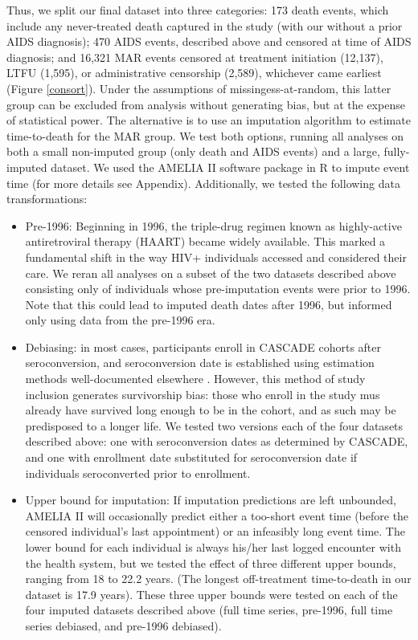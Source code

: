 \documentclass[12pt, titlepage, proquest]{article}
\begin{document}
Thus, we split our final dataset into three categories: 173 death events, which include any never-treated death captured in the study (with our without a prior AIDS diagnosis); 470 AIDS events, described above and censored at time of AIDS diagnosis; and 16,321 MAR events censored at treatment initiation (12,137), LTFU (1,595), or administrative censorship (2,589), whichever came earliest (Figure \ref{consort}). Under the assumptions of missingess-at-random, this latter group can be excluded from analysis without generating bias, but at the expense of statistical power. The alternative is to use an imputation algorithm to estimate time-to-death for the MAR group. We test both options, running all analyses on both a small non-imputed group (only death and AIDS events) and a large, fully-imputed dataset. We used the AMELIA II software package in R \cite{honaker_amelia_2015} to impute event time (for more details see Appendix). Additionally, we tested the following data  transformations:

\begin{itemize}
	\item Pre-1996: Beginning in 1996, the triple-drug regimen known as highly-active antiretroviral therapy (HAART) became widely available. This marked a fundamental shift in the way HIV+ individuals accessed and considered their care. We reran all analyses on a subset of the two datasets described above consisting only of individuals whose pre-imputation events were prior to 1996. Note that this could lead to imputed death dates after 1996, but informed only using data from the pre-1996 era.

	\item Debiasing: in most cases, participants enroll in CASCADE cohorts after seroconversion, and seroconversion date is established using estimation methods well-documented elsewhere \cite{_time_2000}. However, this method of study inclusion generates survivorship bias: those who enroll in the study mus already have survived long enough to be in the cohort, and as such may be predisposed to a longer life. We tested two versions each of the four datasets described above: one with seroconversion dates as determined by CASCADE, and one with enrollment date substituted for seroconversion date if individuals seroconverted prior to enrollment. 
	
	\item Upper bound for imputation: If imputation predictions are left unbounded, AMELIA II will occasionally predict either a too-short event time (before the censored individual's last appointment) or an infeasibly long event time. The lower bound for each individual is always his/her last logged encounter with the health system, but we tested the effect of three different upper bounds, ranging from 18 to 22.2 years. (The longest off-treatment time-to-death in our dataset is 17.9 years). These three upper bounds were tested  on each of the four imputed datasets described above (full time series, pre-1996, full time series debiased, and pre-1996 debiased).

\end{itemize}
\end{document}
